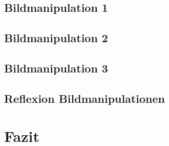 \documentclass[11pt]{article}
\begin{document}
    \subsection{Bildmanipulation 1}


    \subsection{Bildmanipulation 2}

    \subsection{Bildmanipulation 3}

    \subsection{Reflexion Bildmanipulationen}

    \section{Fazit}
\end{document}
